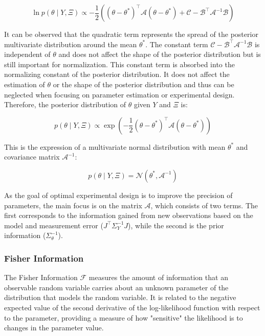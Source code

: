 \documentclass[../Article_Design_of_Experiment.tex]{subfiles}
\begin{document}
	{\footnotesize 
		\begin{equation} 
			\ln p\left(\theta \mid Y, \Xi \right) \propto -\frac{1}{2} \left( \left( \theta - \theta^* \right)^\top \mathcal{A} \left( \theta - \theta^* \right) + \mathcal{C} - \mathcal{B}^\top \mathcal{A}^{-1} \mathcal{B} \right) 
		\end{equation} }
	
	It can be observed that the quadratic term represents the spread of the posterior multivariate distribution around the mean $\theta^*$. The constant term $\mathcal{C} - \mathcal{B}^\top \mathcal{A}^{-1} \mathcal{B}$ is independent of $\theta$ and does not affect the shape of the posterior distribution but is still important for normalization. This constant term is absorbed into the normalizing constant of the posterior distribution. It does not affect the estimation of $\theta$ or the shape of the posterior distribution and thus can be neglected when focusing on parameter estimation or experimental design. Therefore, the posterior distribution of $\theta$ given $Y$ and $\Xi$ is:
	
	{\footnotesize \begin{equation} p\left(\theta \mid Y, \Xi \right) \propto \exp \left( -\frac{1}{2} \left( \theta - \theta^* \right)^\top \mathcal{A} \left( \theta - \theta^* \right) \right) \end{equation} }
	
	This is the expression of a multivariate normal distribution with mean $\theta^*$ and covariance matrix $\mathcal{A}^{-1}$:
	
	{\footnotesize \begin{equation} p\left(\theta \mid Y, \Xi \right) = \mathcal{N}\left( \theta^*, \mathcal{A}^{-1} \right) \end{equation} }
	
	As the goal of optimal experimental design is to improve the precision of parameters, the main focus is on the matrix $\mathcal{A}$, which consists of two terms. The first corresponds to the information gained from new observations based on the model and measurement error ($J^\top \Sigma_Y^{-1} J$), while the second is the prior information ($\Sigma_\theta^{-1}$).
	
	\subsubsection{Fisher Information}
	
	The Fisher Information $\mathcal{F}$ measures the amount of information that an observable random variable carries about an unknown parameter of the distribution that models the random variable. It is related to the negative expected value of the second derivative of the log-likelihood function with respect to the parameter, providing a measure of how "sensitive" the likelihood is to changes in the parameter value.
	
\end{document}
